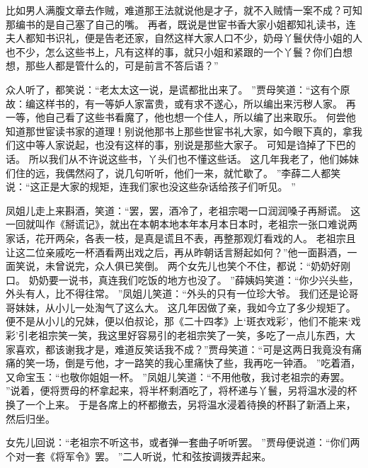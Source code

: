 比如男人满腹文章去作贼，难道那王法就说他是才子，就不入贼情一案不成？可知那编书的是自己塞了自己的嘴。
再者，既说是世宦书香大家小姐都知礼读书，连夫人都知书识礼，便是告老还家，自然这样大家人口不少，奶母丫鬟伏侍小姐的人也不少，怎么这些书上，凡有这样的事，就只小姐和紧跟的一个丫鬟？你们白想想，那些人都是管什么的，可是前言不答后语？”\par
众人听了，都笑说：“老太太这一说，是谎都批出来了。
”贾母笑道：“这有个原故：编这样书的，有一等妒人家富贵，或有求不遂心，所以编出来污秽人家。
再一等，他自己看了这些书看魔了，他也想一个佳人，所以编了出来取乐。
何尝他知道那世宦读书家的道理！别说他那书上那些世宦书礼大家，如今眼下真的，拿我们这中等人家说起，也没有这样的事，别说是那些大家子。
可知是诌掉了下巴的话。
所以我们从不许说这些书，丫头们也不懂这些话。
这几年我老了，他们姊妹们住的远，我偶然闷了，说几句听听，他们一来，就忙歇了。
”李薛二人都笑说：“这正是大家的规矩，连我们家也没这些杂话给孩子们听见。
”
\par
凤姐儿走上来斟酒，笑道：“罢，罢，酒冷了，老祖宗喝一口润润嗓子再掰谎。
这一回就叫作《掰谎记》，就出在本朝本地本年本月本日本时，老祖宗一张口难说两家话，花开两朵，各表一枝，是真是谎且不表，再整那观灯看戏的人。
老祖宗且让这二位亲戚吃一杯酒看两出戏之后，再从昨朝话言掰起如何？”他一面斟酒，一面笑说，未曾说完，众人俱已笑倒。
两个女先儿也笑个不住，都说：“奶奶好刚口。
奶奶要一说书，真连我们吃饭的地方也没了。
”薛姨妈笑道：“你少兴头些，外头有人，比不得往常。
”凤姐儿笑道：“外头的只有一位珍大爷。
我们还是论哥哥妹妹，从小儿一处淘气了这么大。
这几年因做了亲，我如今立了多少规矩了。
便不是从小儿的兄妹，便以伯叔论，那《二十四孝》上‘斑衣戏彩’，他们不能来‘戏彩’引老祖宗笑一笑，我这里好容易引的老祖宗笑了一笑，多吃了一点儿东西，大家喜欢，都该谢我才是，难道反笑话我不成？”贾母笑道：“可是这两日我竟没有痛痛的笑一场，倒是亏他，才一路笑的我心里痛快了些，我再吃一钟酒。
”吃着酒，又命宝玉：“也敬你姐姐一杯。
”凤姐儿笑道：“不用他敬，我讨老祖宗的寿罢。
”说着，便将贾母的杯拿起来，将半杯剩酒吃了，将杯递与丫鬟，另将温水浸的杯换了一个上来。
于是各席上的杯都撤去，另将温水浸着待换的杯斟了新酒上来，然后归坐。
\par
女先儿回说：“老祖宗不听这书，或者弹一套曲子听听罢。
”贾母便说道：“你们两个对一套《将军令》罢。
”二人听说，忙和弦按调拨弄起来。
